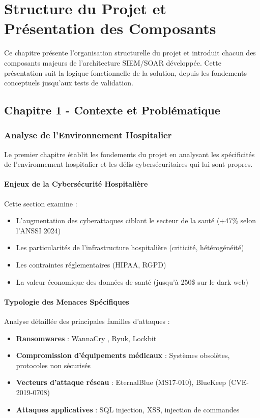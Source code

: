 \chapter{Structure du Projet et Présentation des Composants}

Ce chapitre présente l'organisation structurelle du projet et introduit chacun des composants majeurs de l'architecture SIEM/SOAR développée. Cette présentation suit la logique fonctionnelle de la solution, depuis les fondements conceptuels jusqu'aux tests de validation.

\section{Chapitre 1 - Contexte et Problématique}

\subsection{Analyse de l'Environnement Hospitalier}

Le premier chapitre établit les fondements du projet en analysant les spécificités de l'environnement hospitalier et les défis cybersécuritaires qui lui sont propres.

\subsubsection{Enjeux de la Cybersécurité Hospitalière}
Cette section examine :
\begin{itemize}
    \item L'augmentation des cyberattaques ciblant le secteur de la santé (+47\% selon l'ANSSI 2024)
    \item Les particularités de l'infrastructure hospitalière (criticité, hétérogénéité)
    \item Les contraintes réglementaires (HIPAA, RGPD)
    \item La valeur économique des données de santé (jusqu'à 250\$ sur le dark web)
\end{itemize}

\subsubsection{Typologie des Menaces Spécifiques}
Analyse détaillée des principales familles d'attaques :
\begin{itemize}
    \item \textbf{Ransomwares} : WannaCry , Ryuk, Lockbit
    \item \textbf{Compromission d'équipements médicaux} : Systèmes obsolètes, protocoles non sécurisés
    \item \textbf{Vecteurs d'attaque réseau} : EternalBlue (MS17-010), BlueKeep (CVE-2019-0708)
    \item \textbf{Attaques applicatives} : SQL injection, XSS, injection de commandes
\end{itemize}

